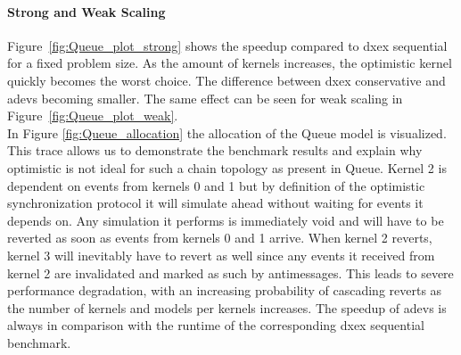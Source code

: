 \paragraph*{Strong and Weak Scaling}
Figure~\ref{fig:Queue_plot_strong} shows the speedup compared to dxex sequential for a fixed problem size. As the amount of kernels increases, the optimistic kernel quickly becomes the worst choice. The difference between dxex conservative and adevs becoming smaller. The same effect can be seen for weak scaling in Figure~\ref{fig:Queue_plot_weak}.\\
In Figure \ref{fig:Queue_allocation} the allocation of the Queue model is visualized. This trace allows us to demonstrate the benchmark results and explain why optimistic is not ideal for such a chain topology as present in Queue. Kernel 2 is dependent on events from kernels 0 and 1 but by definition of the optimistic synchronization protocol it will simulate ahead without waiting for events it depends on. Any simulation it performs is immediately void and will have to be reverted as soon as events from kernels 0 and 1 arrive. When kernel 2 reverts, kernel 3 will inevitably have to revert as well since any events it received from kernel 2 are invalidated and marked as such by antimessages. This leads to severe performance degradation, with an increasing probability of cascading reverts as the number of kernels and models per kernels increases.
The speedup of adevs is always in comparison with the runtime of the corresponding dxex sequential benchmark.
